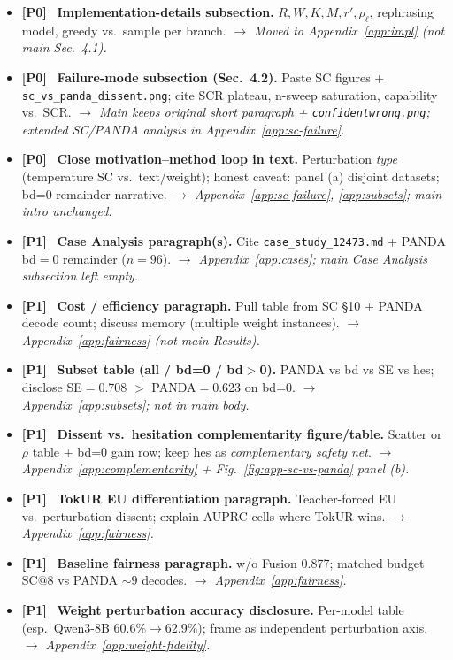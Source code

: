 \documentclass[11pt]{article}
\newcommand{\done}{\item[\textcolor{donecolor}{$\boxtimes$}]}
\newcommand{\tagp}[2]{\textbf{\textcolor{#1}{[#2]}}\ }
\newcommand{\fixnote}[1]{\newline\textcolor{p2}{\itshape $\rightarrow$ #1}}
\begin{document}
\begin{itemize}
  \done \tagp{p0}{P0} \textbf{Implementation-details subsection.}
        $R,W,K,M,r',\rho_\ell$, rephrasing model, greedy vs.\ sample per branch.
        \fixnote{Moved to Appendix~\ref{app:impl} (not main Sec.\ 4.1).}

  \done \tagp{p0}{P0} \textbf{Failure-mode subsection (Sec.\ 4.2).}
        Paste SC figures + \texttt{sc\_vs\_panda\_dissent.png}; cite SCR plateau, n-sweep saturation, capability vs.\ SCR.
        \fixnote{Main keeps original short paragraph + \texttt{confidentwrong.png}; extended SC/PANDA analysis in Appendix~\ref{app:sc-failure}.}

  \done \tagp{p0}{P0} \textbf{Close motivation--method loop in text.}
        Perturbation \emph{type} (temperature SC vs.\ text/weight); honest caveat: panel (a) disjoint datasets; bd=0 remainder narrative.
        \fixnote{Appendix~\ref{app:sc-failure}, \ref{app:subsets}; main intro unchanged.}

  \done \tagp{p1}{P1} \textbf{Case Analysis paragraph(s).}
        Cite \texttt{case\_study\_12473.md} + PANDA bd$=0$ remainder ($n{=}96$).
        \fixnote{Appendix~\ref{app:cases}; main Case Analysis subsection left empty.}

  \done \tagp{p1}{P1} \textbf{Cost / efficiency paragraph.}
        Pull table from SC \S10 + PANDA decode count; discuss memory (multiple weight instances).
        \fixnote{Appendix~\ref{app:fairness} (not main Results).}

  \done \tagp{p1}{P1} \textbf{Subset table (all / bd=0 / bd$>$0).}
        PANDA vs bd vs SE vs hes; disclose SE$=$0.708 $>$ PANDA$=$0.623 on bd=0.
        \fixnote{Appendix~\ref{app:subsets}; not in main body.}

  \done \tagp{p1}{P1} \textbf{Dissent vs.\ hesitation complementarity figure/table.}
        Scatter or $\rho$ table + bd=0 gain row; keep hes as \emph{complementary safety net}.
        \fixnote{Appendix~\ref{app:complementarity} + Fig.~\ref{fig:app-sc-vs-panda} panel (b).}

  \done \tagp{p1}{P1} \textbf{TokUR EU differentiation paragraph.}
        Teacher-forced EU vs.\ perturbation dissent; explain AUPRC cells where TokUR wins.
        \fixnote{Appendix~\ref{app:fairness}.}

  \done \tagp{p1}{P1} \textbf{Baseline fairness paragraph.}
        w/o Fusion 0.877; matched budget SC@8 vs PANDA ${\sim}9$ decodes.
        \fixnote{Appendix~\ref{app:fairness}.}

  \done \tagp{p1}{P1} \textbf{Weight perturbation accuracy disclosure.}
        Per-model table (esp.\ Qwen3-8B 60.6\%$\rightarrow$62.9\%); frame as independent perturbation axis.
        \fixnote{Appendix~\ref{app:weight-fidelity}.}
\end{itemize}
\end{document}
